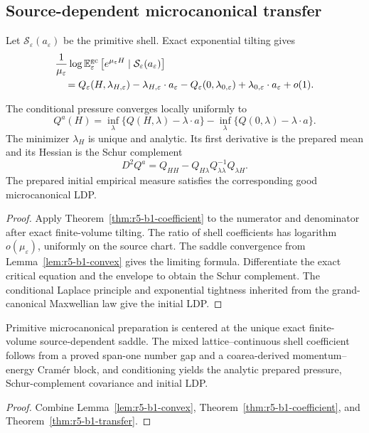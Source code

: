 \subsection{Source-dependent microcanonical transfer}

Let \(\mathcal S_\varepsilon(a_\varepsilon)\) be the primitive shell.  Exact
exponential tilting gives
\[
 \begin{aligned}
 &\frac1{\mu_\varepsilon}
 \log\mathbb E_\varepsilon^{\rm gc}
 \left[e^{\mu_\varepsilon H}\mid
       \mathcal S_\varepsilon(a_\varepsilon)\right]\\
 &\quad=
 Q_\varepsilon(H,\lambda_{H,\varepsilon})
 -\lambda_{H,\varepsilon}\cdot a_\varepsilon
 -Q_\varepsilon(0,\lambda_{0,\varepsilon})
 +\lambda_{0,\varepsilon}\cdot a_\varepsilon+o(1).
\end{aligned}
\]

\begin{theorem}
\label{thm:r5-b1-transfer}
The conditional pressure converges locally uniformly to
\[
 Q^a(H)=
 \inf_\lambda\{Q(H,\lambda)-\lambda\cdot a\}
 -\inf_\lambda\{Q(0,\lambda)-\lambda\cdot a\}.
\]
The minimizer \(\lambda_H\) is unique and analytic.  Its first derivative is
the prepared mean and its Hessian is the Schur complement
\[
 D^2Q^a=
 Q_{HH}-Q_{H\lambda}Q_{\lambda\lambda}^{-1}Q_{\lambda H}.
\]
The prepared initial empirical measure satisfies the corresponding good
microcanonical LDP.
\end{theorem}

\begin{proof}
Apply Theorem~\ref{thm:r5-b1-coefficient} to the numerator and denominator
after exact finite-volume tilting.  The ratio of shell coefficients has
logarithm \(o(\mu_\varepsilon)\), uniformly on the source chart.  The saddle
convergence from Lemma~\ref{lem:r5-b1-convex} gives the limiting formula.
Differentiate the exact critical equation and the envelope to obtain the
Schur complement.  The conditional Laplace principle and exponential
tightness inherited from the grand-canonical Maxwellian law give the initial
LDP.
\end{proof}

\begin{theorem}
\label{thm:r5-b1-main}
Primitive microcanonical preparation is centered at the unique exact
finite-volume source-dependent saddle.  The mixed lattice--continuous shell
coefficient follows from a proved span-one number gap and a coarea-derived
momentum--energy Cram\'er block, and conditioning yields the analytic prepared
pressure, Schur-complement covariance and initial LDP.
\end{theorem}

\begin{proof}
Combine Lemma~\ref{lem:r5-b1-convex},
Theorem~\ref{thm:r5-b1-coefficient}, and
Theorem~\ref{thm:r5-b1-transfer}.
\end{proof}
